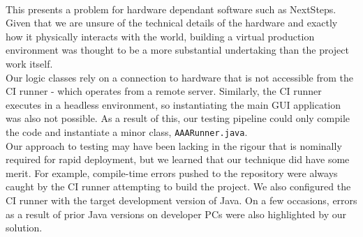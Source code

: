 \documentclass{l3proj}
\begin{document}
\\This presents a problem for hardware dependant software such as NextSteps. Given that we are unsure of the technical details of the hardware and exactly how it physically interacts with the world, building a virtual production environment was thought to be a more substantial undertaking than the project work itself. 
\\Our logic classes rely on a connection to hardware that is not accessible from the CI runner - which operates from a remote server. 
Similarly, the CI runner executes in a headless environment, so instantiating the main GUI application was also not possible. 
As a result of this, our testing pipeline could only compile the code and instantiate a minor class, \verb|AAARunner.java|. 
\\Our approach to testing may have been lacking in the rigour that is nominally required for rapid deployment, but we learned that our technique did have some merit. For example, compile-time errors pushed to the repository were always caught by the CI runner attempting to build the project. 
We also configured the CI runner with the target development version of Java. On a few occasions, errors as a result of prior Java versions on developer PCs were also highlighted by our solution. 
\end{document}

